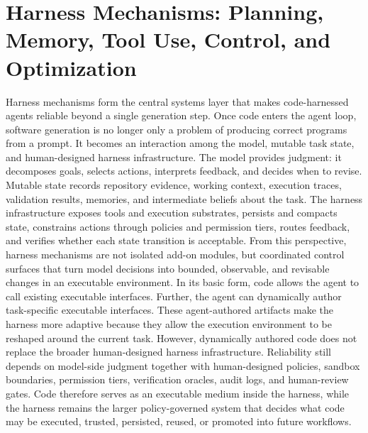 \section{Harness Mechanisms: Planning, Memory, Tool Use, Control, and Optimization}
\label{sec:modules}



Harness mechanisms form the central systems layer that makes code-harnessed agents reliable beyond a
single generation step. Once code enters the agent loop, software generation is no longer only a problem of producing correct programs from a prompt. It becomes an interaction among the model, mutable task state, and human-designed harness infrastructure. The model provides judgment: it decomposes goals, selects actions, interprets feedback, and decides when to revise. Mutable state records repository evidence, working context, execution traces, validation results, memories, and intermediate beliefs about the task. The harness infrastructure exposes tools and execution substrates, persists and compacts state, constrains actions through policies and permission tiers, routes feedback, and verifies whether each state transition is acceptable. From this perspective, harness mechanisms are not isolated add-on modules, but coordinated control surfaces that turn model decisions into bounded, observable, and revisable changes in an executable environment.
In its basic form, code allows the agent to call existing executable interfaces. 
Further, the agent can dynamically author task-specific executable interfaces. These agent-authored artifacts make the harness more adaptive because they allow the execution environment to be reshaped around the current task. However, dynamically authored code does not replace the broader human-designed harness infrastructure. Reliability still depends on model-side judgment together with human-designed policies, sandbox boundaries, permission tiers, verification oracles, audit logs, and human-review gates. Code therefore serves as an executable medium inside the harness, while the harness remains the larger policy-governed system that decides what code may be executed, trusted, persisted, reused, or promoted into future workflows.

